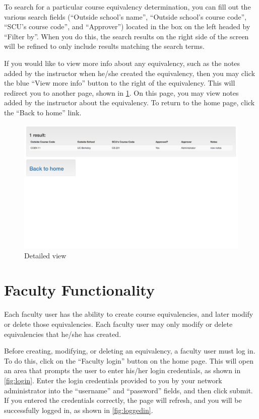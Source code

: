 \documentclass{article}
\begin{document}
\par To search for a particular course equivalency determination, you can fill
out the various search fields (``Outside school's name'', ``Outside school's course
code'', ``SCU's course code'', and ``Approver'') located in the box on the left
headed by ``Filter by''. When you do this, the search results on the right side
of the screen will be refined to only include results matching the search terms.

\par If you would like to view more info about any equivalency, such as the
notes added by the instructor when he/she created the equivalency, then you may
click the blue ``View more info'' button to the right of the equivalency. This
will redirect you to another page, shown in \cref{fig:detailedview}. On this page, you may view
notes added by the instructor about the equivalency. To return to the home
page, click the ``Back to home'' link.

\begin{figure}[h]
\includegraphics[width=15cm]{detailedview}
\centering
\caption{Detailed view}
\label{fig:detailedview}
\end{figure}

\section{Faculty Functionality}
\par Each faculty user has the ability to create course equivalencies, and later
modify or delete those equivalencies. Each faculty user may only modify or
delete equivalencies that he/she has created.

\par Before creating, modifying, or deleting an equivalency, a faculty user must log in.
To do this, click on the ``Faculty login'' button on the home page. This will
open an area that prompts the user to enter his/her login credentials, as shown
in \cref{fig:login}. Enter the login credentials provided to you by your network
administrator into the ``username'' and ``password'' fields, and then click submit.
If you entered the credentials correctly, the page will refresh, and you will be
successfully logged in, as shown in \cref{fig:loggedin}.
\end{document}
